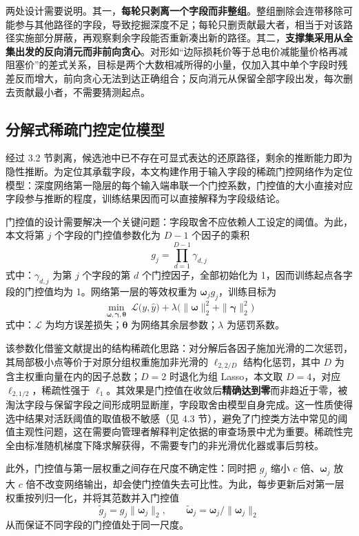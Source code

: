 \documentclass[UTF8,zihao=5,twoside]{ctexart}
\begin{document}
两处设计需要说明。其一，\textbf{每轮只剥离一个字段而非整组}。整组删除会连带移除可能参与其他路径的字段，导致挖掘深度不足；每轮只删贡献最大者，相当于对该路径实施部分屏蔽，再观察剩余字段能否重新凑出新的路径。其二，\textbf{支撑集采用从全集出发的反向消元而非前向贪心}。对形如“边际损耗价等于总电价减能量价格再减阻塞价”的差式关系，目标是两个大数相减所得的小量，仅加入其中单个字段时残差反而增大，前向贪心无法到达正确组合；反向消元从保留全部字段出发，每次删去贡献最小者，不需要猜测起点。

\subsection{分解式稀疏门控定位模型}

经过 3.2 节剥离，候选池中已不存在可显式表达的还原路径，剩余的推断能力即为隐性推断。为定位其承载字段，本文构建作用于输入字段的稀疏门控网络作为定位模型：深度网络第一隐层的每个输入端串联一个门控系数，门控值的大小直接对应字段参与推断的程度，训练结果因而可以直接解释为字段级结论。

门控值的设计需要解决一个关键问题：字段取舍不应依赖人工设定的阈值。为此，本文将第 $j$ 个字段的门控值参数化为 $D-1$ 个因子的乘积
\begin{equation}
g_j=\prod_{d=1}^{D-1}\gamma_{d,j}
\end{equation}
式中：$\gamma_{d,j}$ 为第 $j$ 个字段的第 $d$ 个门控因子，全部初始化为 1，因而训练起点各字段的门控值均为 1。网络第一层的等效权重为 $\bm{\omega}_j g_j$，训练目标为
\begin{equation}
\min_{\bm{\omega},\bm{\gamma},\bm{\theta}}\ \mathcal{L}\big(y,\hat y\big)
+\lambda\Big(\|\bm{\omega}\|_2^2+\|\bm{\gamma}\|_2^2\Big)
\end{equation}
式中：$\mathcal{L}$ 为均方误差损失；$\bm{\theta}$ 为网络其余层参数；$\lambda$ 为惩罚系数。

该参数化借鉴文献\cite{ref-dgating}提出的结构稀疏化思路：对分解后各因子施加光滑的二次惩罚，其局部极小点等价于对原分组权重施加非光滑的 $\ell_{2,2/D}$ 结构化惩罚，其中 $D$ 为含主权重向量在内的因子总数；$D=2$ 时退化为组 Lasso，本文取 $D=4$，对应 $\ell_{2,1/2}$，稀疏性强于 $\ell_1$。其效果是门控值在收敛后\textbf{精确达到零}而非趋近于零，被淘汰字段与保留字段之间形成明显断崖，字段取舍由模型自身完成。这一性质使得选中结果对活跃阈值的取值极不敏感（见 4.3 节），避免了门控类方法中常见的阈值主观性问题，这在需要向管理者解释判定依据的审查场景中尤为重要。稀疏性完全由标准随机梯度下降求解获得，不需要专门的非光滑优化器或事后剪枝。

此外，门控值与第一层权重之间存在尺度不确定性：同时把 $g_j$ 缩小 $c$ 倍、$\bm{\omega}_j$ 放大 $c$ 倍不改变网络输出，却会使门控值失去可比性。为此，每步更新后对第一层权重按列归一化，并将其范数并入门控值
\begin{equation}
\tilde g_j=g_j\|\bm{\omega}_j\|_2,\qquad
\tilde{\bm{\omega}}_j=\bm{\omega}_j/\|\bm{\omega}_j\|_2
\end{equation}
从而保证不同字段的门控值处于同一尺度。
\end{document}
